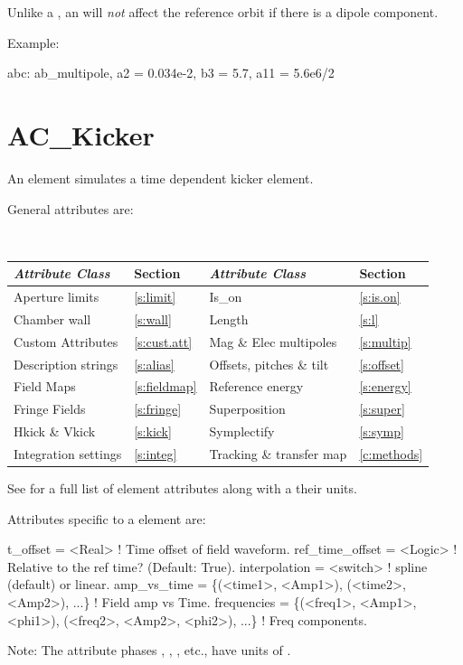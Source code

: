 Unlike a , an  will {\em not} affect the
reference orbit if there is a dipole component. 

Example:
\begin{example}
  abc: ab_multipole, a2 = 0.034e-2, b3 = 5.7, a11 = 5.6e6/2
\end{example}

\section{AC_Kicker}
\label{s:ac.kick}

An  element simulates a time dependent kicker element.

General  attributes are:
\begin{center}
\tt
\begin{tabular}{llll} \toprule
  {\sl Attribute Class}      & Section           & {\sl Attribute Class}      & Section         \\ \midrule
  Aperture limits            & \ref{s:limit}     & Is_on                      & \ref{s:is.on}   \\
  Chamber wall               & \ref{s:wall}      & Length                     & \ref{s:l}       \\
  Custom Attributes          & \ref{s:cust.att}  & Mag \& Elec multipoles     & \ref{s:multip}  \\
  Description strings        & \ref{s:alias}     & Offsets, pitches \& tilt   & \ref{s:offset}  \\
  Field Maps                 & \ref{s:fieldmap}  & Reference energy           & \ref{s:energy}  \\ 
  Fringe Fields              & \ref{s:fringe}    & Superposition              & \ref{s:super}   \\
  Hkick \& Vkick             & \ref{s:kick}      & Symplectify                & \ref{s:symp}    \\
  Integration settings       & \ref{s:integ}     & Tracking \& transfer map   & \ref{c:methods} \\
  \bottomrule
\end{tabular}
\end{center}
\toffset
See  for a full list of element attributes along with a their units.

Attributes specific to a  element are:
\begin{example}
  t_offset        = <Real>              ! Time offset of field waveform.
  ref_time_offset = <Logic>             ! Relative to the ref time? (Default: True).
  interpolation   = <switch>            ! spline (default) or linear.
  amp_vs_time = \{(<time1>, <Amp1>), (<time2>, <Amp2>), ...\}  ! Field amp vs Time.
  frequencies = \{(<freq1>, <Amp1>, <phi1>), 
                              (<freq2>, <Amp2>, <phi2>), ...\} ! Freq components.
\end{example}
Note: The  attribute phases , , , etc., have units of
.

